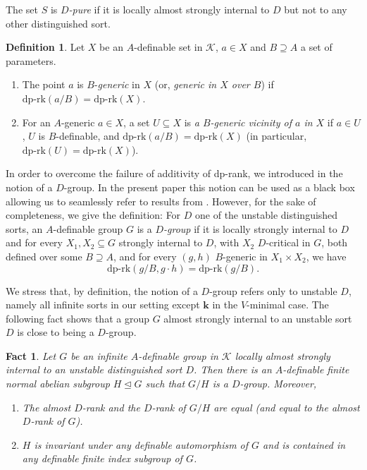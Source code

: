 \documentclass[11pt]{amsart}
\newtheorem{fact}[theorem]{Fact}
\theoremstyle{definition}
\newtheorem{definition}[theorem]{Definition}
\newcommand{\bk}{\textbf{k}}
\newcommand{\CK}{{\mathcal K}}
\newcommand{\0}{\emptyset}
\def\dpr{\mathrm{dp\text{-}rk}}
\def\sub{\subseteq}
\begin{document}
The set  $S$ is \emph{$D$-pure}  if it is locally almost strongly internal to $D$ but not to any other distinguished sort.  

\begin{definition}
    Let $X$ be an $A$-definable set in $\CK$, $a\in X$ and $B\supseteq A$ a set of parameters.
    \begin{enumerate}
        \item The point $a$ is $B$-\emph{generic}  in $X$ (or, {\em generic in $X$ over $B$}) if $\dpr(a/B)=\dpr(X)$.
        \item For an  $A$-generic  $a\in X$, a set $U\sub X$ is \emph{a $B$-generic vicinity of $a$ in $X$} if $a\in U$, $U$ is $B$-definable, and $\dpr(a/B)=\dpr(X)$ (in particular, $\dpr(U)=\dpr(X)$).
    \end{enumerate}
\end{definition}



In order to overcome the failure of additivity of dp-rank, we introduced in \cite{HaHaPeGps} the notion of a $D$-group. In the present paper this notion can be used as a black box allowing us to seamlessly refer to results from \cite{HaHaPeGps}. However, for the sake of completeness, we give the definition:   For $D$ one of the unstable distinguished sorts, an $A$-definable group $G$ is a \emph{ $D$-group} if it is locally strongly internal to $D$ and for every $X_1, X_2\subseteq G$  strongly internal to $D$, with $X_2$ $D$-critical in $G$,  both defined  over some $B\supseteq A$, and for every $(g,h)$ $B$-generic in $X_1\times X_2$, we have \[\dpr(g/B,g\cdot h)=\dpr(g/B).\]



We stress that, by definition, the notion of a $D$-group refers only to unstable $D$, namely all infinite sorts in our setting except $\bk$ in the $V$-minimal case. 
 The following fact shows that a group $G$  almost strongly internal to an unstable sort $D$ is close to being a $D$-group.
 
 \begin{fact}\cite[Fact 4.25, Proposition 4.35]{HaHaPeGps}\label{F: existence of finite normla to get D-group}
     Let $G$ be an infinite $A$-definable group in $\CK$ locally almost strongly internal to an unstable distinguished sort $D$. Then there is an $A$-definable finite  normal abelian subgroup $H\trianglelefteq G$ such that $G/H$ is a $D$-group. Moreover, 
     \begin{enumerate}
         \item The almost $D$-rank and the $D$-rank of $G/H$ are equal (and equal to the almost $D$-rank of $G$).
         \item $H$ is invariant under any definable automorphism of $G$ and is contained in any definable finite index subgroup of $G$. 
     \end{enumerate}
 \end{fact}
 
\end{document}
